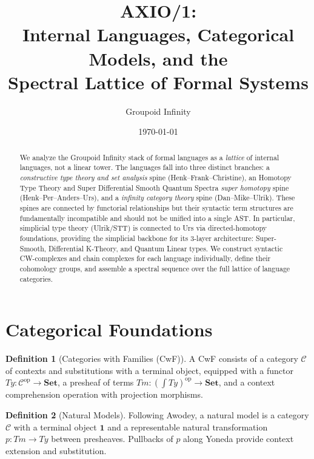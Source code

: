 \documentclass{article}
\title{AXIO/1:\\
Internal Languages, Categorical Models, and the\\
Spectral Lattice of Formal Systems}
\author{Groupoid Infinity}
\date{\today}
\theoremstyle{definition}
\newtheorem{definition}{Definition}[section]
\theoremstyle{plain}
\begin{document}
\maketitle

\begin{abstract}
We analyze the Groupoid Infinity stack of formal languages as a \emph{lattice} of
internal languages, not a linear tower. The languages fall into three distinct
branches: a \emph{constructive type theory and set analysis} spine (Henk--Frank--Christine),
an Homotopy Type Theory and Super Differential Smooth Quantum Spectra \emph{super homotopy} spine (Henk--Per--Anders--Urs),
and a \emph{infinity category theory} spine (Dan--Mike--Ulrik). These spines are connected by functorial relationships
but their syntactic term structures are fundamentally incompatible and should not be
unified into a single AST. In particular, simplicial type theory (Ulrik/STT)
is connected to Urs via directed-homotopy foundations, providing the simplicial
backbone for its 3-layer architecture: Super-Smooth, Differential K-Theory, and Quantum Linear types.
We construct syntactic CW-complexes and chain complexes for each language individually,
define their cohomology groups, and assemble a spectral sequence over the full lattice of language categories.
\end{abstract}

\newpage
\tableofcontents
\newpage

\section{Categorical Foundations}

\begin{definition}[Categories with Families (CwF)]
A CwF consists of a category $\mathcal{C}$ of contexts and substitutions with a terminal object, equipped with a functor $Ty : \mathcal{C}^{\mathrm{op}} \to \mathbf{Set}$, a presheaf of terms $Tm : (\int Ty)^{\mathrm{op}} \to \mathbf{Set}$, and a context comprehension operation with projection morphisms.
\end{definition}

\begin{definition}[Natural Models]
Following Awodey, a natural model is a category $\mathcal{C}$ with a terminal
object $\mathbf{1}$ and a representable natural transformation $p : Tm \to Ty$ between presheaves.
Pullbacks of $p$ along Yoneda provide context extension and substitution.
\end{definition}
\end{document}
